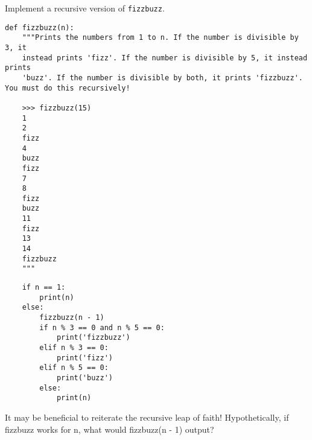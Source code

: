 \begin{blocksection}
\question Implement a recursive version of \lstinline$fizzbuzz$.

\begin{lstlisting}
def fizzbuzz(n):
    """Prints the numbers from 1 to n. If the number is divisible by 3, it
    instead prints 'fizz'. If the number is divisible by 5, it instead prints
    'buzz'. If the number is divisible by both, it prints 'fizzbuzz'. You must do this recursively!

    >>> fizzbuzz(15)
    1
    2
    fizz
    4
    buzz
    fizz
    7
    8
    fizz
    buzz
    11
    fizz
    13
    14
    fizzbuzz
    """
\end{lstlisting}

\begin{solution}[1.5in]
\begin{lstlisting}
    if n == 1:
        print(n)
    else:
        fizzbuzz(n - 1)
        if n % 3 == 0 and n % 5 == 0:
            print('fizzbuzz')
        elif n % 3 == 0:
            print('fizz')
        elif n % 5 == 0:
            print('buzz')
        else:
            print(n)
\end{lstlisting}
\end{solution}
\end{blocksection}

\begin{questionmeta}
    It may be beneficial to reiterate the recursive leap of faith! Hypothetically, if fizzbuzz works for n, what would fizzbuzz(n - 1) output?
  \end{questionmeta}
